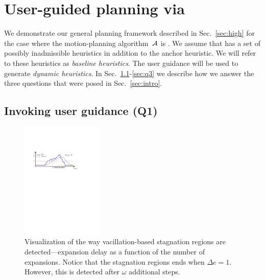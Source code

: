 \documentclass{article}
\begin{document}
\section{User-guided planning via \mhastar}
\label{sec:planning}

We demonstrate our general planning framework described in Sec.~\ref{sec:high} for the case where the motion-planning algorithm~$\mathcal{A}$ is  \mhastar.
We assume that \mhastar has a set of possibly inadmissible heuristics in addition to the anchor heuristic. We will refer to these heuristics as \emph{baseline heuristics}.
The user guidance will be used to generate \emph{dynamic heuristics}.
In Sec.~\ref{sec:q1}-\ref{sec:q3} we describe how we answer the three questions that were posed in Sec.~\ref{sec:intro}.

\subsection{Invoking user guidance (Q1)}
\label{sec:q1}

\begin{figure}
  \centering
  \includegraphics[width=0.35\textwidth]{fig/local_min_detection_new2.pdf}
	\vspace{-3mm}

  \caption{%
    Visualization of the way vacillation-based stagnation regions are detected---expansion delay as a function of the number of expansions.  
    Notice that the stagnation regions ends when $\Delta e = 1$.
    However, this is detected after $\omega$ additional steps.}

	\vspace{-3mm}
  \label{fig:filmstrip-local-min}%
\end{figure}
\end{document}
